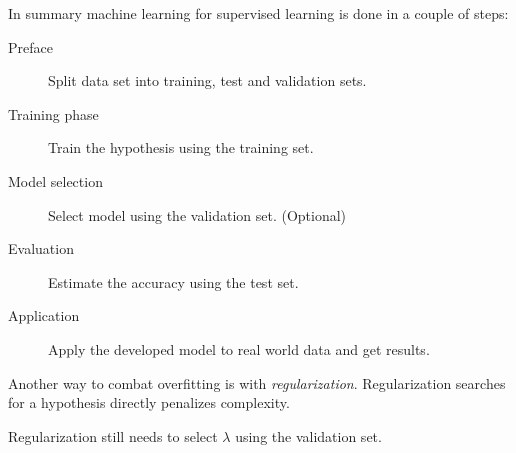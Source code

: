 In summary machine learning for supervised learning is done in a couple of steps:

\begin{description}
    \item[Preface] Split data set into training, test and validation sets.
    \item[Training phase] Train the hypothesis using the training set.
    \item[Model selection] Select model using the validation set. (Optional)
    \item[Evaluation] Estimate the accuracy using the test set.
    \item[Application] Apply the developed model to real world data and get results.
\end{description}

Another way to combat overfitting is with \textit{regularization}. Regularization searches for a hypothesis directly penalizes complexity.
\citep{norvigAI}

Regularization still needs to select $\lambda$ using the validation set.
